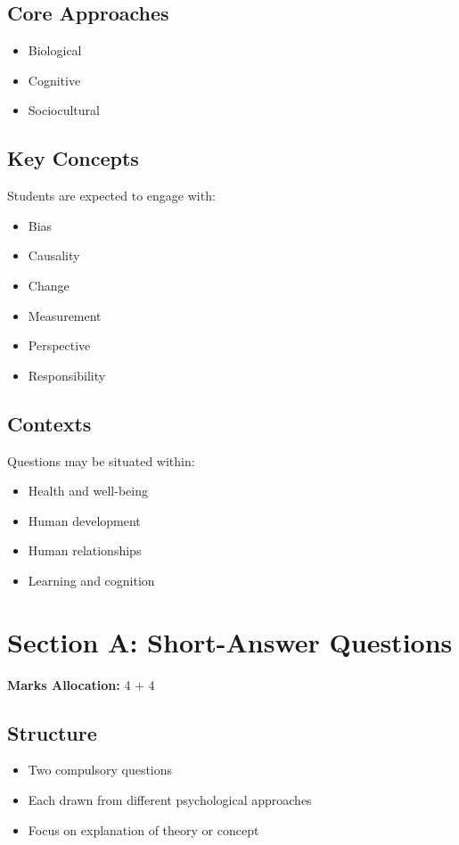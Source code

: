 \documentclass[12pt,a4paper]{article}
\begin{document}
\subsection*{Core Approaches}
\begin{itemize}
    \item Biological
    \item Cognitive
    \item Sociocultural
\end{itemize}

\subsection*{Key Concepts}
Students are expected to engage with:
\begin{itemize}
    \item Bias
    \item Causality
    \item Change
    \item Measurement
    \item Perspective
    \item Responsibility
\end{itemize}

\subsection*{Contexts}
Questions may be situated within:
\begin{itemize}
    \item Health and well-being
    \item Human development
    \item Human relationships
    \item Learning and cognition
\end{itemize}

\newpage

\section{Section A: Short-Answer Questions}

\textbf{Marks Allocation:} 4 + 4

\subsection*{Structure}
\begin{itemize}
    \item Two compulsory questions
    \item Each drawn from different psychological approaches
    \item Focus on explanation of theory or concept
\end{itemize}
\end{document}
